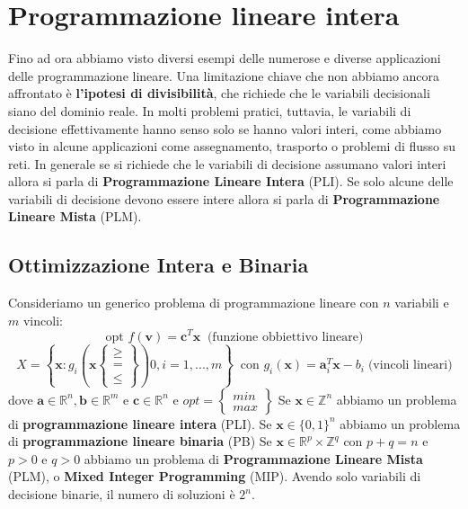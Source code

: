 \documentclass[12pt]{article}
\begin{document}
\section{Programmazione lineare intera}
Fino ad ora abbiamo visto diversi esempi delle numerose e diverse applicazioni delle programmazione lineare.
Una limitazione chiave che non abbiamo ancora affrontato è \textbf{l'ipotesi di divisibilità}, che richiede che le variabili decisionali siano 
del dominio reale. In molti problemi pratici, tuttavia, le variabili di decisione effettivamente hanno senso solo se hanno valori interi, come abbiamo visto in alcune applicazioni come
assegnamento, trasporto o problemi di flusso su reti.
In generale se si richiede che le variabili di decisione assumano valori interi allora si parla di \textbf{Programmazione Lineare Intera} (PLI).
Se solo alcune delle variabili di decisione devono essere intere allora si parla di \textbf{Programmazione Lineare Mista} (PLM).
\subsection{Ottimizzazione Intera e Binaria}
Consideriamo un generico problema di programmazione lineare con $n$ variabili e $m$ vincoli:
$$\textrm{opt } f(\boldsymbol{v}) = \boldsymbol{c}^T\boldsymbol{x} \; \; \textrm{(funzione obbiettivo lineare)}$$
$$X = \left \{ \boldsymbol{x}: g_i(\boldsymbol{x} \begin{Bmatrix}
    \geq \\
    = \\
    \leq
\end{Bmatrix}) 0, i = 1,...,m \right \} \; \; \textrm{con } g_i(\boldsymbol{x}) = \boldsymbol{a}_i^T\boldsymbol{x} - b_i \; \textrm{(vincoli lineari)}$$
dove $\boldsymbol{a} \in \mathbb{R}^n, \boldsymbol{b} \in \mathbb{R}^m$ e $\boldsymbol{c} \in \mathbb{R}^n$ e $opt = \begin{Bmatrix}
    min \\
    max
\end{Bmatrix}$
Se $\boldsymbol{x} \in \mathbb{Z}^n$ abbiamo un problema di \textbf{programmazione lineare intera} (PLI). \newline
Se $\boldsymbol{x} \in \{0,1\}^n$ abbiamo un problema di \textbf{programmazione lineare binaria} (PB) \newline
Se $\boldsymbol{x} \in \mathbb{R}^p \times \mathbb{Z}^q$ con $p + q = n$ e $p > 0$ e $q > 0$ abbiamo un problema di \textbf{Programmazione Lineare Mista} (PLM), o
\textbf{Mixed Integer Programming} (MIP).
Avendo solo variabili di decisione binarie, il numero di soluzioni è $2^n$.
\end{document}
